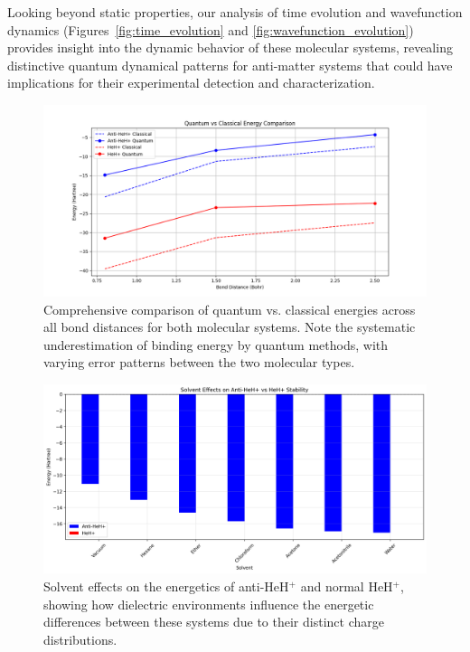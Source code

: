 \documentclass[10pt,twocolumn,a4paper]{article}
\begin{document}
Looking beyond static properties, our analysis of time evolution and wavefunction dynamics (Figures~\ref{fig:time_evolution} and \ref{fig:wavefunction_evolution}) provides insight into the dynamic behavior of these molecular systems, revealing distinctive quantum dynamical patterns for anti-matter systems that could have implications for their experimental detection and characterization.

\begin{figure}[t!]
    \centering
    \includegraphics[width=\columnwidth]{graphs/quantum_vs_classical_energies.png}
    \caption{Comprehensive comparison of quantum vs. classical energies across all bond distances for both molecular systems. Note the systematic underestimation of binding energy by quantum methods, with varying error patterns between the two molecular types.}
    \label{fig:quantum_vs_classical}
\end{figure}

\begin{figure}[t!]
    \centering
    \includegraphics[width=\columnwidth]{graphs/corrected_solvent_effects.png}
    \caption{Solvent effects on the energetics of anti-HeH$^+$ and normal HeH$^+$, showing how dielectric environments influence the energetic differences between these systems due to their distinct charge distributions.}
    \label{fig:solvent_effects}
\end{figure}
\end{document}
